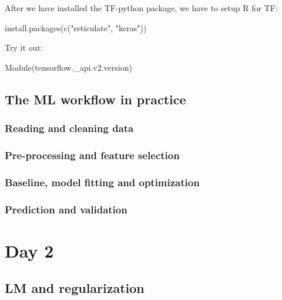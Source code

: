 \documentclass[a4paper,twoside]{tufte-book}\usepackage[]{graphicx}\usepackage[]{color}
\begin{document}
After we have installed the TF-python package, we have to setup R for TF:
\begin{Schunk}
\begin{Sinput}
install.packages(c("reticulate", "keras"))
\end{Sinput}
\end{Schunk}
Try it out:
\begin{Schunk}
\begin{Soutput}
Module(tensorflow._api.v2.version)
\end{Soutput}
\end{Schunk}


\section{The ML workflow in practice }

\subsection{Reading and cleaning data}

\subsection{Pre-processing and feature selection}

\subsection{Baseline, model fitting and optimization}

\subsection{Prediction and validation}


\chapter{Day 2 }




\section{LM and regularization}
\end{document}
